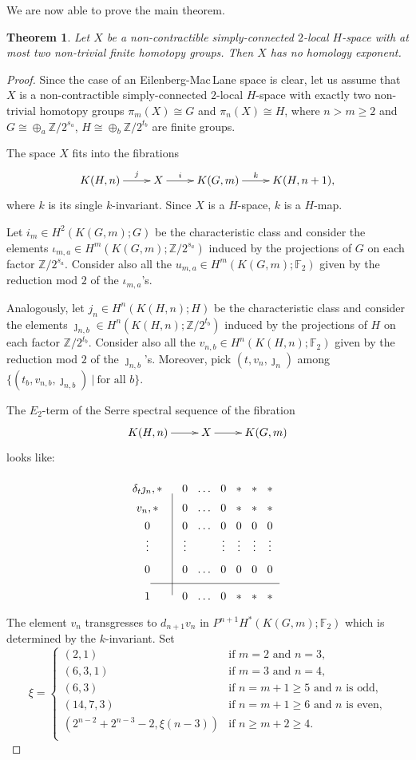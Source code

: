 \documentclass{conm-p-l}
\newtheorem{thm}{Theorem}[section]
\theoremstyle{definition}
\newcommand{\Z}{\mathbb{Z}}
\newcommand{\F}{\mathbb{F}}
\renewcommand{\geq}{\geqslant}
\begin{document}
We are now able to prove the main theorem.

\begin{thm}\label{t:main}
Let $X$ be a non-contractible simply-connected $2$-local ${H}$-space with at most two non-trivial finite homotopy groups. Then $X$ has no homology exponent.
\end{thm}

\begin{proof}
Since the case of an Eilenberg-Mac\,Lane space is clear, let us assume that $X$ is a non-contractible simply-connected $2$-local ${H}$-space with exactly two non-trivial homotopy groups $\pi_m(X)\cong G$ and $\pi_n(X)\cong H$, where $n>m\geq2$ and $G\cong\oplus_a\Z/2^{s_a}$, $H\cong\oplus_b\Z/2^{t_b}$ are finite groups. 

The space $X$ fits into the fibrations
$$\xymatrix{
K(H,n)\ar[r]^-j &X\ar[r]^-i &K(G,m)\ar[r]^-k &K(H,n+1),
}$$
where $k$ is its single $k$-invariant. Since $X$ is a ${H}$-space, $k$ is a $H$-map.

Let $i_m\in H^2(K(G,m);G)$ be the characteristic class and consider the elements $\iota_{m,a}\in H^m(K(G,m);\Z/2^{s_a})$ induced by the projections of $G$ on each factor $\Z/2^{s_a}$. Consider also all the $u_{m,a}\in H^m(K(G,m);\F_2)$ given by the reduction mod $2$ of the $\iota_{m,a}$'s.

Analogously, let $j_n\in H^n(K(H,n);H)$ be the characteristic class and consider the elements $\jmath_{n,b}\in H^n(K(H,n);\Z/2^{t_b})$ induced by the projections of $H$ on each factor $\Z/2^{t_b}$. Consider also all the $v_{n,b}\in H^n(K(H,n);\F_2)$ given by the reduction mod $2$ of the $\jmath_{n,b}$'s. Moreover, pick $(t,v_n,\jmath_n)$ among $\{(t_b,v_{n,b},\jmath_{n,b})\ |\ \text{for all $b$}\}$.

The $E_2$-term of the Serre spectral sequence of the fibration $$\xymatrix{K(H,n)\ar[r]&X\ar[r]&K(G,m)}$$ looks like:
$$\xymatrix@R=0.1cm@C=0.1cm{
&&\\
{\delta_t\jmath_n,*}  &&0 &\dots &0 &{*} &{*} &{*}\\
{v_n,*}  &&0 &\dots &0 &{*} &{*} &{*}\\
{0} &&0 &\dots &0 &0 &0 &0\\
{\vdots} &&\vdots & &\vdots &\vdots &\vdots &\vdots\\
{0} &&0 &\dots &0 &0 &0 &0\\ \ar@{-}[rrrrrrrr] &&&&&&&&\\
{1} &\ar@{-}[uuuuuu] &{0} &{\dots} &{0} &{*} &{*} &{*}}
$$

The element $v_n$ transgresses to $d_{n+1}v_n$ in $P^{n+1}H^*(K(G,m);\F_2)$ which is determined by the $k$-invariant. Set 
$$
\xi=\begin{cases}
(2,1) &\text{if $m=2$ and $n=3$,}\\
(6,3,1) &\text{if $m=3$ and $n=4$,}\\
(6,3) &\text{if $n=m+1\geq5$ and $n$ is odd,}\\
(14,7,3) &\text{if $n=m+1\geq6$ and $n$ is even,}\\
(2^{n-2}+2^{n-3}-2,\xi(n-3)) &\text{if $n\geq m+2\geq4$.}\\
\end{cases}
$$


\end{proof}
\end{document}
